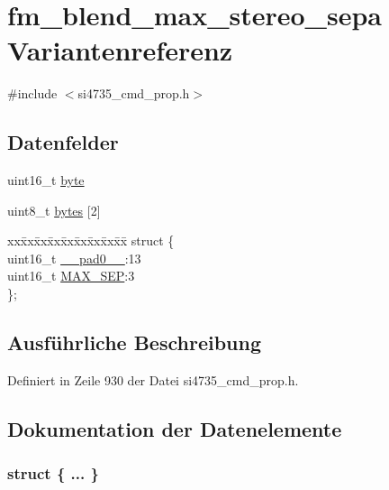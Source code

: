 \hypertarget{unionfm__blend__max__stereo__sepa}{}\section{fm\+\_\+blend\+\_\+max\+\_\+stereo\+\_\+sepa Variantenreferenz}
\label{unionfm__blend__max__stereo__sepa}


{\ttfamily \#include $<$si4735\+\_\+cmd\+\_\+prop.\+h$>$}

\subsection*{Datenfelder}
\begin{DoxyCompactItemize}
\item 
uint16\+\_\+t \hyperlink{unionfm__blend__max__stereo__sepa_ab0549c1b5ea980a02e7eab77e21fea49}{byte}
\item 
uint8\+\_\+t \hyperlink{unionfm__blend__max__stereo__sepa_a46e4c05d20a047ec169f60d3167e912e}{bytes} \mbox{[}2\mbox{]}
\item 
\begin{tabbing}
xx\=xx\=xx\=xx\=xx\=xx\=xx\=xx\=xx\=\kill
struct \{\\
\>uint16\_t \hyperlink{unionfm__blend__max__stereo__sepa_a77132c2c26a75f5b8751b235cda23828}{\_\_pad0\_\_}:13\\
\>uint16\_t \hyperlink{unionfm__blend__max__stereo__sepa_aa66d0206353a48c2ce247b9951607855}{MAX\_SEP}:3\\
\}; \\

\end{tabbing}\end{DoxyCompactItemize}


\subsection{Ausführliche Beschreibung}


Definiert in Zeile 930 der Datei si4735\+\_\+cmd\+\_\+prop.\+h.



\subsection{Dokumentation der Datenelemente}
\hypertarget{unionfm__blend__max__stereo__sepa_a5ffd9f979ab2625656f72799bcc5fde6}{}\subsubsection[{"@115}]{\setlength{\rightskip}{0pt plus 5cm}struct \{ ... \} }\label{unionfm__blend__max__stereo__sepa_a5ffd9f979ab2625656f72799bcc5fde6}
\hypertarget{unionfm__blend__max__stereo__sepa_a77132c2c26a75f5b8751b235cda23828}{}
